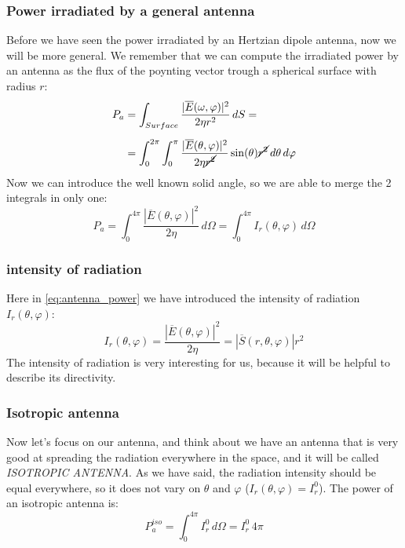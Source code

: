 \subsubsection*{Power irradiated by a general antenna}
Before we have seen the power irradiated by an Hertzian dipole antenna, now we will be more general. We remember that we can compute the irradiated power by an antenna as the flux of the poynting vector trough a spherical surface with radius $r$:
\begin{align}
    \begin{split}
        P_a&=\int_{Surface}\frac{|\overline{E}(\omega,\varphi)|^2}{2\eta r^2}\,dS=\\[5pt]
        &=\int_0^{2\pi}\int_0^\pi \frac{|\overline{E}(\theta,\varphi)|^2}{2\eta\cancel{r^2}}\sin(\theta)\cancel{r^2}\,d\theta\,d\varphi
    \end{split}
\end{align}
Now we can introduce the well known solid angle, so we are able to merge the 2 integrals in only one:
\begin{equation}\label{eq:antenna_power}
    P_a=\int_0^{4\pi}\frac{|\overline{E}(\theta,\varphi)|^2}{2\eta}\,d\Omega=\int_0^{4\pi}I_r(\theta,\varphi)\,d\Omega
\end{equation}
\subsubsection*{intensity of radiation}
Here in \cref{eq:antenna_power} we have introduced the intensity of radiation $I_r(\theta,\varphi)$:
\begin{equation}\label{eq:radiation_intensity}
    I_r(\theta,\varphi)=\frac{|\overline{E}(\theta,\varphi)|^2}{2\eta}=|\overline{S}(r,\theta,\varphi)|r^2
\end{equation}
The intensity of radiation is very interesting for us, because it will be helpful to describe its directivity.
\subsubsection*{Isotropic antenna}
Now let's focus on our antenna, and think about we have an antenna that is very good at spreading the radiation everywhere in the space, and it will be called \emph{ISOTROPIC ANTENNA}. As we have said, the radiation intensity should be equal everywhere, so it does not vary on $\theta$ and $\varphi$ ($I_r(\theta,\varphi)=I_r^0$). The power of an isotropic antenna is:
\begin{equation}\label{eq:power_isotropic_antenna}
    P_a^{iso}=\int_0^{4\pi}I^0_r\,d\Omega=I^0_r\,4\pi
\end{equation}
